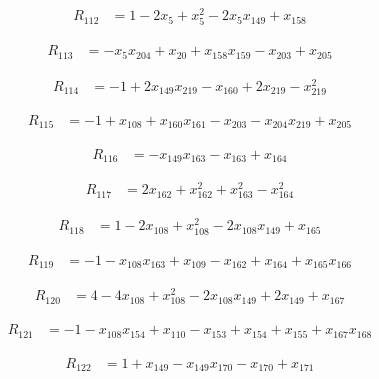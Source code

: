 \begin{align*}
R_{112} &= 1 -2 x_{5} +x_{5}^{2} -2 x_{5} x_{149} +x_{158}
\end{align*}

\begin{align*}
R_{113} &= -x_{5} x_{204} +x_{20} +x_{158} x_{159} -x_{203} +x_{205}
\end{align*}

\begin{align*}
R_{114} &= -1 +2 x_{149} x_{219} -x_{160} +2 x_{219} -x_{219}^{2}
\end{align*}

\begin{align*}
R_{115} &= -1 +x_{108} +x_{160} x_{161} -x_{203} -x_{204} x_{219} +x_{205}
\end{align*}

\begin{align*}
R_{116} &= -x_{149} x_{163} -x_{163} +x_{164}
\end{align*}

\begin{align*}
R_{117} &= 2 x_{162} +x_{162}^{2} +x_{163}^{2} -x_{164}^{2}
\end{align*}

\begin{align*}
R_{118} &= 1 -2 x_{108} +x_{108}^{2} -2 x_{108} x_{149} +x_{165}
\end{align*}

\begin{align*}
R_{119} &= -1 -x_{108} x_{163} +x_{109} -x_{162} +x_{164} +x_{165} x_{166}
\end{align*}

\begin{align*}
R_{120} &= 4 -4 x_{108} +x_{108}^{2} -2 x_{108} x_{149} +2 x_{149} +x_{167}
\end{align*}

\begin{align*}
R_{121} &= -1 -x_{108} x_{154} +x_{110} -x_{153} +x_{154} +x_{155} +x_{167} x_{168}
\end{align*}

\begin{align*}
R_{122} &= 1 +x_{149} -x_{149} x_{170} -x_{170} +x_{171}
\end{align*}

